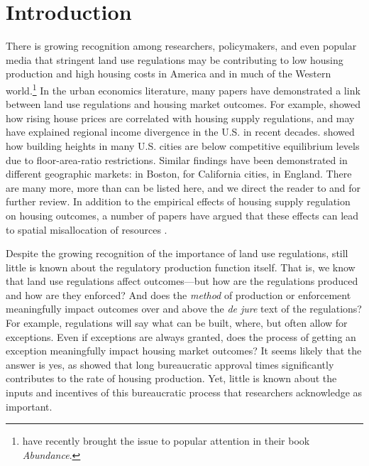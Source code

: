 \section{Introduction}\label{sec_intro}

There is growing recognition among researchers, policymakers, and even popular media that stringent land use regulations may be contributing to low housing production and high housing costs in America and in much of the Western world.\footnote{\citet{klein2025abundance} have recently brought the issue to popular attention in their book \emph{Abundance}.} In the urban economics literature, many papers have demonstrated a link between land use regulations and housing market outcomes. For example, \citet{ganongshoag2017} showed how rising house prices are correlated with housing supply regulations, and may have explained regional income divergence in the U.S. in recent decades. \citet{brueckner2020} showed how building heights in many U.S. cities are below competitive equilibrium levels due to floor-area-ratio restrictions. Similar findings have been demonstrated in different geographic markets: \citet{glaeser2009} in Boston, \citet{jackson2016} for California cities, \citet{hilber2016} in England. There are many more, more than can be listed here, and we direct the reader to \citet{gyourkomolloy2015} and \citet{molloy2020} for further review. In addition to the empirical effects of housing supply regulation on housing outcomes, a number of papers have argued that these effects can lead to spatial misallocation of resources \citep{turner2014, albouy2018, hsieh2019, gabriel2020}. 

Despite the growing recognition of the importance of land use regulations, still little is known about the regulatory production function itself. That is, we know that land use regulations affect outcomes---but how are the regulations produced and how are they enforced? And does the \emph{method} of production or enforcement meaningfully impact outcomes over and above the \emph{de jure} text of the regulations? For example, regulations will say what can be built, where, but often allow for exceptions. Even if exceptions are always granted, does the process of getting an exception meaningfully impact housing market outcomes? It seems likely that the answer is yes, as \citet{gabrielkung2025} showed that long bureaucratic approval times significantly contributes to the rate of housing production. Yet, little is known about the inputs and incentives of this bureaucratic process that researchers acknowledge as important.




